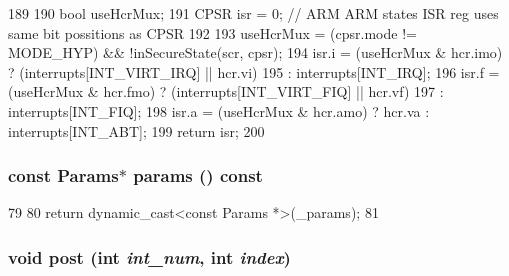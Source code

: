 \begin{DoxyCode}
189     {
190         bool useHcrMux;
191         CPSR isr = 0; // ARM ARM states ISR reg uses same bit possitions as CPSR
192 
193         useHcrMux = (cpsr.mode != MODE_HYP) && !inSecureState(scr, cpsr);
194         isr.i = (useHcrMux & hcr.imo) ? (interrupts[INT_VIRT_IRQ] || hcr.vi)
195                                       :  interrupts[INT_IRQ];
196         isr.f = (useHcrMux & hcr.fmo) ? (interrupts[INT_VIRT_FIQ] || hcr.vf)
197                                       :  interrupts[INT_FIQ];
198         isr.a = (useHcrMux & hcr.amo) ?  hcr.va : interrupts[INT_ABT];
199         return isr;
200     }
\end{DoxyCode}
\hypertarget{classArmISA_1_1Interrupts_acd3c3feb78ae7a8f88fe0f110a718dff}{
\subsubsection[{params}]{\setlength{\rightskip}{0pt plus 5cm}const {\bf Params}$\ast$ params () const}}
\label{classArmISA_1_1Interrupts_acd3c3feb78ae7a8f88fe0f110a718dff}



\begin{DoxyCode}
79     {
80         return dynamic_cast<const Params *>(_params);
81     }
\end{DoxyCode}
\hypertarget{classArmISA_1_1Interrupts_a24c6c4fbdc0605bcd015ce06f194e4b4}{
\subsubsection[{post}]{\setlength{\rightskip}{0pt plus 5cm}void post (int {\em int\_\-num}, \/  int {\em index})}}
\label{classArmISA_1_1Interrupts_a24c6c4fbdc0605bcd015ce06f194e4b4}



